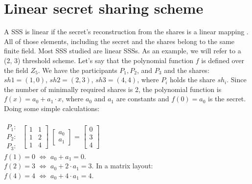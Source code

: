 \documentclass[12pt, a4paper, oneside]{book}
\begin{document}
    \section{Linear secret sharing scheme}
    A SSS is linear if the secret's reconstruction from the shares is a linear mapping \cite{SecretSurveyB}. All of those elements, including the secret and the shares belong to the same finite field.
    Most SSS studied are linear SSSs.
    As an example, we will refer to a (2, 3) threshold scheme. Let's say that the polynomial function $f$ is defined over the field $Z_5$. We have the participants $P_1, P_2$, and $P_3$ and the shares: $sh1{=}(1, 0)$, $ sh2{=}(2, 3)$, $sh3{=}(4, 4)$, where $P_i$ holds the share $sh_i$. Since the number of minimally required shares is 2, the polynomial function is $f(x){=}a_0{+}a_1{\cdot}x$, where $a_0$ and $a_1$ are constants and $f(0){=}a_0$ is the secret.
    Doing some simple calculations:
    \\~\\
    {\vspace{-1.5cm}\hspace{8cm}
        $
        \begin{matrix}
        P_1:\\
        P_2:\\
        P_3:
        \end{matrix}
        $
    \vspace{-0,5cm}
        $
        \begin{bmatrix}
        1 & 1\\
        1 & 2\\
        1 & 4
        \end{bmatrix}
        $
        $
        \begin{bmatrix}
        a_0\\
        a_1 
        \end{bmatrix}
        $
        {=}
        $
        \begin{bmatrix}
        0\\
        3\\
        4
        \end{bmatrix}
        $
    }
    \vspace{0.5cm}
    \\
    $f(1){=}0$ ${\Leftrightarrow}$ $a_0+a_1{=}0$.
    \\
    $f(2){=}3$ ${\Leftrightarrow}$ $a_0+2{\cdot}a_1{=}3$. In a matrix layout:
    \\
    $f(4){=}4$ ${\Leftrightarrow}$ $a_0+4{\cdot}a_1{=}4$.
    \\
    
\end{document}
